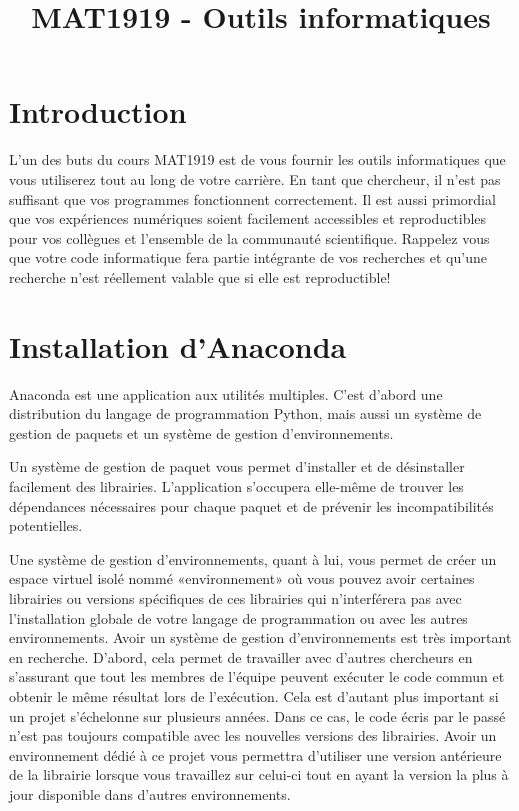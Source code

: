\documentclass{article}
\title{MAT1919 - Outils informatiques}
\author{}
\date{}
\begin{document}
\maketitle

\section{Introduction}

L'un des buts du cours MAT1919 est de vous fournir les outils informatiques que vous utiliserez tout au long de votre carrière. En tant que chercheur, il n'est pas suffisant que vos programmes fonctionnent correctement. Il est aussi primordial que vos expériences numériques soient facilement accessibles et reproductibles pour vos collègues et l'ensemble de la communauté scientifique. Rappelez vous que votre code informatique fera partie intégrante de vos recherches et qu'une recherche n'est réellement valable que si elle est reproductible!

\section{Installation d'Anaconda}

Anaconda est une application aux utilités multiples. C'est d'abord une distribution du langage de programmation Python, mais aussi un système de gestion de paquets et un système de gestion d'environnements.

Un système de gestion de paquet vous permet d'installer et de désinstaller facilement des librairies. L'application s'occupera elle-même de trouver les dépendances nécessaires pour chaque paquet et de prévenir les incompatibilités potentielles.

Une système de gestion d'environnements, quant à lui, vous permet de créer un espace virtuel isolé nommé «environnement» où vous pouvez avoir certaines librairies ou versions spécifiques de ces librairies qui n'interférera pas avec l'installation globale de votre langage de programmation ou avec les autres environnements. Avoir un système de gestion d'environnements est très important en recherche. D'abord, cela permet de travailler avec d'autres chercheurs en s'assurant que tout les membres de l'équipe peuvent exécuter le code commun et obtenir le même résultat lors de l'exécution. Cela est d'autant plus important si un projet s'échelonne sur plusieurs années. Dans ce cas, le code écris par le passé n'est pas toujours compatible avec les nouvelles versions des librairies. Avoir un environnement dédié à ce projet vous permettra d'utiliser une version antérieure de la librairie lorsque vous travaillez sur celui-ci tout en ayant la version la plus à jour disponible dans d'autres environnements.
\end{document}
